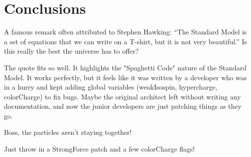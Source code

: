 \section{Conclusions}

A famous remark often attributed to Stephen Hawking: ``The Standard Model is a set of equations that we can write on a T-shirt, but it is not very beautiful.''
Is this really the best the universe has to offer?

The quote fits so well. It highlights the "Spaghetti Code" nature of the Standard Model.
It works perfectly, but it feels like it was written by a developer who was in a hurry and kept adding global variables (weakIsospin, hypercharge, colorCharge) to fix bugs.
Maybe the original architect left without writing any documentation, and now the junior developers are just patching things as they go.

Boss, the particles aren't staying together!

Just throw in a StrongForce patch and a few colorCharge flags!

